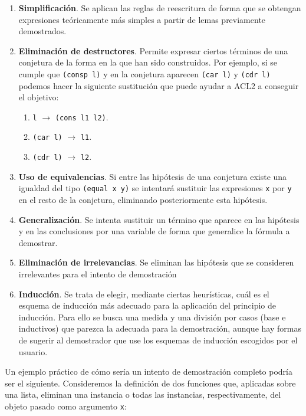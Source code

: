 \documentclass[a4paper,10pt]{article}
\begin{document}
\begin{enumerate}
	\item \textbf{Simplificación}. Se aplican las reglas de reescritura de forma que se obtengan expresiones teóricamente más simples a partir de lemas previamente demostrados. 
	\item \textbf{Eliminación de destructores}. Permite expresar ciertos términos de una conjetura de la forma en la que han sido construidos. Por ejemplo, si se cumple que \texttt{(consp l)} y en la conjetura aparecen \texttt{(car l)} y \texttt{(cdr l)} podemos hacer la siguiente sustitución que puede ayudar a ACL2 a conseguir el objetivo:
	\begin{enumerate}
		\item \texttt{l} $\to$ \texttt{(cons l1 l2)}.
		\item \texttt{(car l)} $\to$ \texttt{l1}.
		\item \texttt{(cdr l)} $\to$ \texttt{l2}.
	\end{enumerate}
	\item \textbf{Uso de equivalencias}. Si entre las hipótesis de una conjetura existe una igualdad del tipo \texttt{(equal x y)} se intentará sustituir las expresiones \texttt{x} por \texttt{y} en el resto de la conjetura, eliminando posteriormente esta hipótesis.
	\item \textbf{Generalización}. Se intenta sustituir un término que aparece en las hipótesis y en las conclusiones por una variable de forma que generalice la fórmula a demostrar.
	\item \textbf{Eliminación de irrelevancias}. Se eliminan las hipótesis que se consideren irrelevantes para el intento de demostración
	\item \textbf{Inducción}. Se trata de elegir, mediante ciertas heurísticas, cuál es el esquema de inducción más adecuado para la aplicación del principio de inducción. Para ello se busca una medida y una división por casos (base e inductivos) que parezca la adecuada para la demostración, aunque hay formas de sugerir al demostrador que use los esquemas de inducción escogidos por el usuario.
\end{enumerate}

\par\vspace{10pt}

Un ejemplo práctico de cómo sería un intento de demostración completo podría ser el siguiente. Consideremos la definición de dos funciones que, aplicadas sobre una lista, eliminan una instancia o todas las instancias, respectivamente, del objeto pasado como argumento \texttt{x}:
\end{document}
